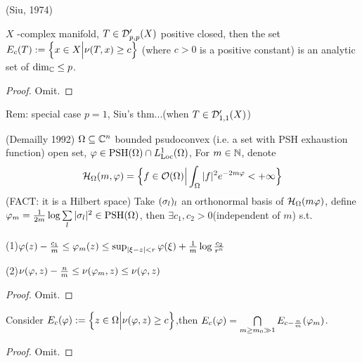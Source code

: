 \begin{thm}(Siu, 1974)

$X$ -complex manifold, $T\in\mathcal{D}'_{p,p}(X)$ positive closed,
then the set $E_c(T):=\Big\{ x\in X \Big| \nu(T,x)\geq c \Big\}$
(where $c>0$ is a positive constant)
is an analytic set of $\dim_{\mathbb{C}}\leq p$.
\end{thm}

\begin{proof}
  Omit.
\end{proof}

Rem: special case $p=1$, Siu's thm...(when $T\in\mathcal{D}'_{1,1}(X)$)

\begin{thm}(Demailly 1992)
$\Omega\subseteq\mathbb{C}^n$ bounded psudoconvex
(i.e. a set with PSH exhaustion function) open set,
$\varphi\in\operatorname{PSH}(\Omega)\cap L^1_{\operatorname{Loc}}(\Omega)$, For $m\in\mathbb{N}$,
denote
$$
  \mathcal{H}_{\Omega}(m,\varphi)=
  \Big\{ f\in\mathcal{O}(\Omega) \Big| \int_\Omega|f|^2e^{-2m\varphi}<+\infty \Big\}
$$
(FACT: it is a Hilbert space)
Take $(\sigma_l)_l$ an orthonormal basis of $\mathcal{H}_\Omega(m\varphi)$,
define $\varphi_m=\frac{1}{2m}\log\sum\limits_l|\sigma_l|^2\in\operatorname{PSH}(\Omega)$,
then $\exists c_1,c_2>0$(independent of $m$) s.t.

(1)$\varphi(z)-\frac{c_1}{m}\leq\varphi_m(z)
  \leq\sup_{|\xi-z|<r}\varphi(\xi)+\frac{1}{m}\log\frac{c_2}{r^n}$

(2)$\nu(\varphi,z)-\frac{n}{m}\leq\nu(\varphi_m,z)\leq\nu(\varphi,z)$
\end{thm}

\begin{proof}
  Omit.
\end{proof}

\begin{cor}
Consider $E_c(\varphi):=\Big\{ z\in\Omega \Big| \nu(\varphi,z)\geq c \Big\}$,then
$E_c(\varphi)=\bigcap\limits_{m\geq m_0\gg 1}E_{c-\frac{n}{m}}(\varphi_m)$.
\end{cor}

\begin{proof}
  Omit.
\end{proof}



